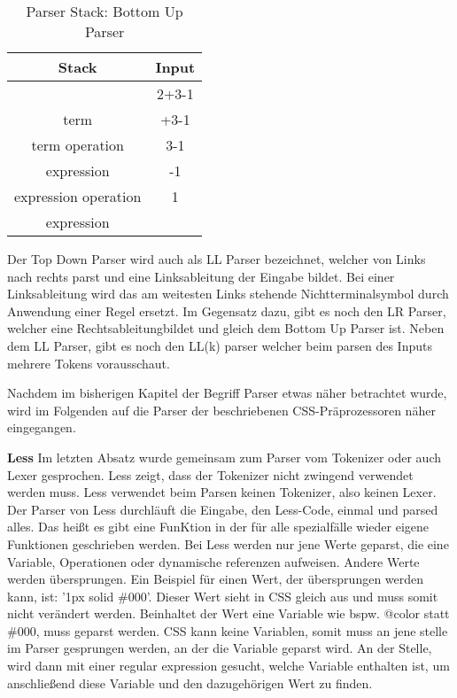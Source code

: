 \begin{table}[h]
          \centering
          \begin{tabular}{|c|c|} \hline
                  \textbf{Stack} & \textbf{Input}\\
                   \hline
                     & 2+3-1\\ \hline
                    term & +3-1\\ \hline
                    term operation &3-1\\ \hline
                    expression & -1\\ \hline
	         expression operation & 1\\ \hline
	        expression & \\ \hline
          \end{tabular}
          \caption{
	       Parser Stack: Bottom Up Parser
          }
         \label{table:Vergleich Browser}
\end{table}\autocite[]{Garsiel.}\newline\newline
Der Top Down Parser wird auch als LL Parser bezeichnet, welcher von Links nach rechts parst und eine Linksableitung der Eingabe bildet. Bei einer Linksableitung wird das am weitesten Links stehende Nichtterminalsymbol durch Anwendung einer Regel ersetzt. Im Gegensatz dazu, gibt es noch den LR Parser, welcher eine Rechtsableitungbildet und gleich dem Bottom Up Parser ist.\newline
Neben dem LL Parser, gibt es noch den LL(k) parser welcher beim parsen des Inputs mehrere Tokens vorausschaut. 

Nachdem im bisherigen Kapitel der Begriff Parser etwas näher betrachtet wurde, wird im Folgenden auf die Parser der beschriebenen CSS-Präprozessoren näher eingegangen.

\textbf{Less}\newline
Im letzten Absatz wurde gemeinsam zum Parser vom Tokenizer oder auch Lexer gesprochen. Less zeigt, dass der Tokenizer nicht zwingend verwendet werden muss.
Less verwendet beim Parsen keinen Tokenizer, also keinen Lexer. Der Parser von Less durchläuft die Eingabe, den Less-Code, einmal und parsed alles. Das heißt es gibt eine FunKtion in der für alle spezialfälle wieder eigene Funktionen geschrieben werden.
Bei Less werden nur jene Werte geparst, die eine Variable, Operationen oder dynamische referenzen aufweisen. Andere Werte werden übersprungen. Ein Beispiel für einen Wert, der übersprungen werden kann, ist: '1px solid \#000'.\newline
Dieser Wert sieht in CSS gleich aus und muss somit nicht verändert werden.\newline
Beinhaltet der Wert eine Variable wie bspw. @color statt \#000, muss geparst werden.\newline
CSS kann keine Variablen, somit muss an jene stelle im Parser gesprungen werden, an der die Variable geparst wird. An der Stelle, wird dann mit einer regular expression gesucht, welche Variable enthalten ist, um anschließend diese Variable und den dazugehörigen Wert zu finden. 

